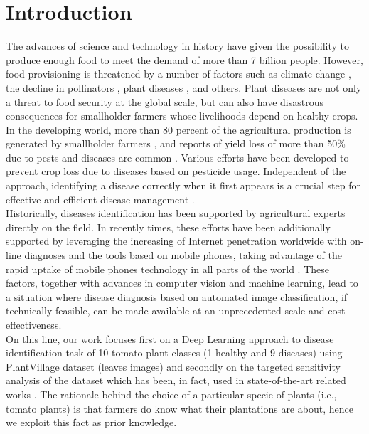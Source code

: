 \section{Introduction}
The advances of science and technology in history have given the possibility to produce enough food to meet the demand of more than 7 billion people. However, food provisioning is threatened by a number of factors such as climate change \cite{ref1}, the decline in pollinators \cite{ref2}, plant diseases \cite{ref3}, and others. Plant diseases are not only a threat to food security at the global scale, but can also have disastrous consequences for smallholder farmers whose livelihoods depend on healthy crops. In the developing world, more than 80 percent of the agricultural production is generated by smallholder farmers \cite{ref5}, and reports of yield loss of more than 50\% due to pests and diseases are common \cite{ref6}.
Various efforts have been developed to prevent crop loss due to diseases based on pesticide usage. Independent of the approach, identifying a disease correctly when it first appears is a crucial step for effective and efficient disease management \cite{ref8}.
\\\indent
Historically, diseases identification has been supported by agricultural experts directly on the field. In recently times, these efforts have been additionally supported by leveraging the increasing of Internet penetration worldwide with on-line diagnoses and the tools based on mobile phones, taking advantage of the rapid uptake of mobile phones technology in all parts of the world \cite{ref9}. These factors, together with advances in computer vision and machine learning, lead to a situation where disease diagnosis based on automated image classification, if technically feasible, can be made available at an unprecedented scale and cost-effectiveness.
\\\indent
On this line, our work focuses first on a Deep Learning approach to disease identification task of 10 tomato plant classes (1 healthy and 9 diseases) using PlantVillage \cite{PlantVillage} dataset (leaves images) and secondly on the targeted sensitivity analysis of the dataset which has been, in fact, used in state-of-the-art related works \cite{ref11, ref10}. The rationale behind the choice of a particular specie of plants (i.e., tomato plants) is that farmers do know what their plantations are about, hence we exploit this fact as prior knowledge.
\\\indent
